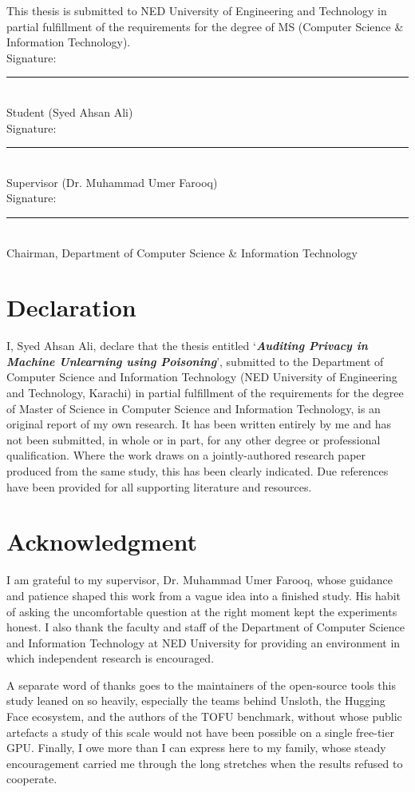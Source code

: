 \documentclass[a4paper,12pt]{report}
\begin{document}
This thesis is submitted to NED University of Engineering and Technology in partial fulfillment of the requirements for the degree of MS (Computer Science \& Information Technology).
\\[1.5cm]

Signature:\rule{5cm}{0.4pt}\\
Student (Syed Ahsan Ali)
\\[1.5cm]

Signature:\rule{5cm}{0.4pt}\\
Supervisor (Dr. Muhammad Umer Farooq)
\\[1.5cm]

Signature:\rule{5cm}{0.4pt}\\
Chairman, Department of Computer Science \& Information Technology

\clearpage
\thispagestyle{empty}
\section*{Declaration}
I, Syed Ahsan Ali, declare that the thesis entitled `\textit{\textbf{Auditing Privacy in Machine Unlearning using Poisoning}}', submitted to the Department of Computer Science and Information Technology (NED University of Engineering and Technology, Karachi) in partial fulfillment of the requirements for the degree of Master of Science in Computer Science and Information Technology, is an original report of my own research. It has been written entirely by me and has not been submitted, in whole or in part, for any other degree or professional qualification. Where the work draws on a jointly-authored research paper produced from the same study, this has been clearly indicated. Due references have been provided for all supporting literature and resources.

\clearpage
\thispagestyle{empty}
\section*{Acknowledgment}
I am grateful to my supervisor, Dr. Muhammad Umer Farooq, whose guidance and patience shaped this work from a vague idea into a finished study. His habit of asking the uncomfortable question at the right moment kept the experiments honest. I also thank the faculty and staff of the Department of Computer Science and Information Technology at NED University for providing an environment in which independent research is encouraged.

A separate word of thanks goes to the maintainers of the open-source tools this study leaned on so heavily, especially the teams behind Unsloth, the Hugging Face ecosystem, and the authors of the TOFU benchmark, without whose public artefacts a study of this scale would not have been possible on a single free-tier GPU. Finally, I owe more than I can express here to my family, whose steady encouragement carried me through the long stretches when the results refused to cooperate.
\end{document}
